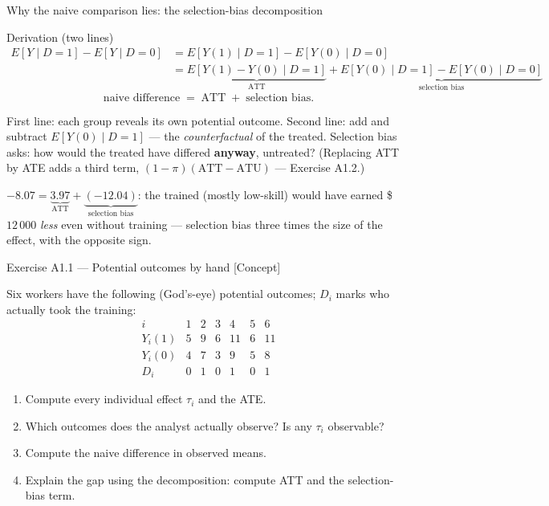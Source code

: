\documentclass[aspectratio=169,11pt]{beamer}
\begin{document}
\begin{frame}{Why the naive comparison lies: the selection-bias decomposition}
  \begin{block}{Derivation (two lines)}
    \vspace{-6pt}
    \begin{align*}
      E[Y\mid D=1]-E[Y\mid D=0]
        &= E[Y(1)\mid D=1]-E[Y(0)\mid D=0] \\
        &= \underbrace{E[Y(1)-Y(0)\mid D=1]}_{\text{ATT}}
           + \underbrace{E[Y(0)\mid D=1]-E[Y(0)\mid D=0]}_{\text{selection bias}}
    \end{align*}
    \vspace{-8pt}
    \[
      \boxed{\;\text{naive difference} \;=\; \text{ATT} \;+\; \text{selection bias}.\;}
    \]
  \end{block}
  \begin{readme}
    First line: each group reveals its own potential outcome. Second line: add and
    subtract $E[Y(0)\mid D=1]$ --- the \emph{counterfactual} of the treated. Selection
    bias asks: how would the treated have differed \textbf{anyway}, untreated?
    (Replacing ATT by ATE adds a third term, $(1-\pi)(\text{ATT}-\text{ATU})$ ---
    Exercise A1.2.)
  \end{readme}
  \begin{numexample}
    $-8.07 = \underbrace{3.97}_{\text{ATT}} + \underbrace{(-12.04)}_{\text{selection bias}}$:
    the trained (mostly low-skill) would have earned \$$12\,000$ \emph{less} even without
    training --- selection bias three times the size of the effect, with the opposite sign.
  \end{numexample}
\end{frame}

\begin{frame}{Exercise A1.1 --- Potential outcomes by hand [Concept]}
\begin{exercise}
  Six workers have the following (God's-eye) potential outcomes; $D_i$ marks who actually
  took the training:
  \[
    \begin{array}{c|cccccc}
      i      & 1 & 2 & 3 & 4  & 5 & 6 \\ \hline
      Y_i(1) & 5 & 9 & 6 & 11 & 6 & 11 \\
      Y_i(0) & 4 & 7 & 3 & 9  & 5 & 8 \\
      D_i    & 0 & 1 & 0 & 1  & 0 & 1
    \end{array}
  \]
  \begin{enumerate}
    \item Compute every individual effect $\tau_i$ and the ATE.
    \item Which outcomes does the analyst actually observe? Is any $\tau_i$ observable?
    \item Compute the naive difference in observed means.
    \item Explain the gap using the decomposition: compute ATT and the selection-bias term.
  \end{enumerate}
\end{exercise}
\end{frame}
\end{document}
